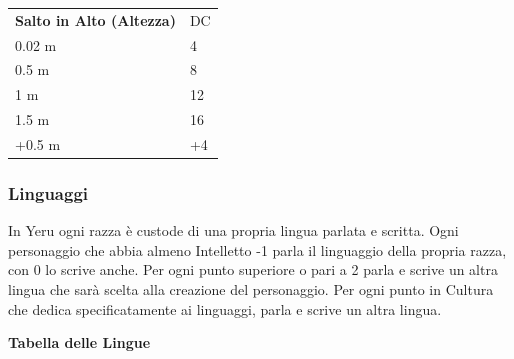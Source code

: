 \documentclass[a4paper,11pt,twoside,openany]{book}
\begin{document}
\begin{tabular}{L{5cm} k{3cm}}
	\toprule
	\textbf{	Salto in Alto (Altezza)} & DC\\
	0.02 m                           & 4\\
	0.5 m                            & 8\\
	1 m                              & 12\\
	1.5 m                            & 16\\
	+0.5 m                           & +4\\
\end{tabular}

\bigskip

\subsubsection{Linguaggi}

\label{linguaggi}

In Yeru ogni razza è custode di una propria lingua parlata e scritta. Ogni personaggio che abbia almeno Intelletto -1 parla il linguaggio della propria razza, con 0 lo scrive anche.
Per ogni punto superiore o pari a 2 parla e scrive un altra lingua che sarà scelta alla creazione del personaggio.
Per ogni punto in Cultura che dedica specificatamente ai linguaggi, parla e scrive un altra lingua.

\bigskip

\textbf{Tabella delle Lingue}

\medskip
\end{document}

